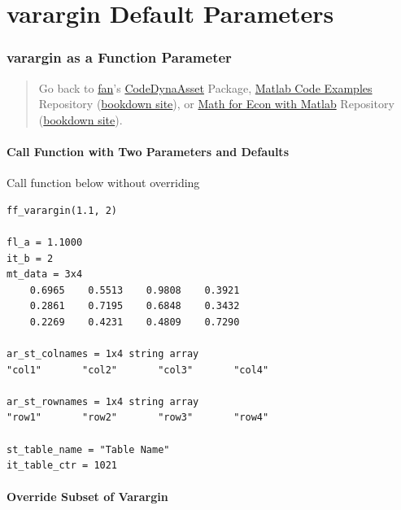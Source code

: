 \documentclass[
]{book}
\begin{document}
\hypertarget{varargin-default-parameters}{%
\section{varargin Default Parameters}\label{varargin-default-parameters}}

\hypertarget{varargin-as-a-function-parameter}{%
\subsubsection{varargin as a Function Parameter}\label{varargin-as-a-function-parameter}}

\begin{quote}
Go back to \href{http://fanwangecon.github.io/}{fan}'s \href{https://fanwangecon.github.io/CodeDynaAsset/}{CodeDynaAsset} Package, \href{https://fanwangecon.github.io/M4Econ/}{Matlab Code Examples} Repository (\href{https://fanwangecon.github.io/M4Econ/bookdown}{bookdown site}), or \href{https://fanwangecon.github.io/Math4Econ/}{Math for Econ with Matlab} Repository (\href{https://fanwangecon.github.io/Math4Econ/bookdown}{bookdown site}).
\end{quote}

\hypertarget{call-function-with-two-parameters-and-defaults}{%
\paragraph{Call Function with Two Parameters and Defaults}\label{call-function-with-two-parameters-and-defaults}}

Call function below without overriding

\begin{verbatim}
ff_varargin(1.1, 2)

fl_a = 1.1000
it_b = 2
mt_data = 3x4    
    0.6965    0.5513    0.9808    0.3921
    0.2861    0.7195    0.6848    0.3432
    0.2269    0.4231    0.4809    0.7290

ar_st_colnames = 1x4 string array    
"col1"       "col2"       "col3"       "col4"       

ar_st_rownames = 1x4 string array    
"row1"       "row2"       "row3"       "row4"       

st_table_name = "Table Name"
it_table_ctr = 1021
\end{verbatim}

\hypertarget{override-subset-of-varargin}{%
\paragraph{Override Subset of Varargin}\label{override-subset-of-varargin}}
\end{document}
